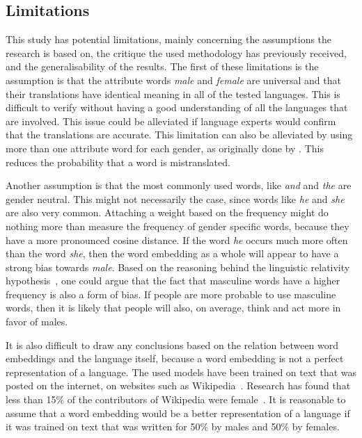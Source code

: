 \subsection{Limitations}
This study has potential limitations, mainly concerning the assumptions the research is based on, the critique the used methodology has previously received, and the generalisability of the results.  
The first of these limitations is the assumption is that
the attribute words \emph{male} and \emph{female} are universal and that their translations
have identical meaning in all of the tested languages. This is difficult
to verify without having a good understanding of all the languages that are involved.
This issue could be alleviated if language experts would confirm that the
translations are accurate.
This limitation can also be alleviated by using more than one
attribute word for each gender, as originally done by \textcite{caliskan_2017_semantics_language_corpora}. This reduces the probability that a word is mistranslated. 

Another assumption is that the most commonly used words, like \textit{and} and \textit{the}
are gender neutral. This might not necessarily the case, since words like \textit{he} and
\textit{she} are also very common. Attaching a weight based on the frequency might do
nothing more than measure the frequency of gender specific words, because they have a
more pronounced cosine distance. If the word \textit{he} occurs much more often than
the word \textit{she}, then the word embedding as a whole will appear to have a strong
bias towards \textit{male}. Based on the reasoning behind the
linguistic relativity hypothesis~\parencite{lucy_linguistic_1997}, one could argue that the fact
that masculine words
have a higher frequency is also a form of bias. If people are more probable
to use masculine words, then it is likely that people will also, on average, think and
act more in favor of males.

It is also difficult to draw any conclusions based on the relation between word
embeddings and the language itself, because a word embedding is not a perfect
representation of a language. The used models have been trained on text that was 
posted on the internet, on websites such as Wikipedia~\parencite{grave2018learning}.
Research has found that less than 15\% of the
contributors of Wikipedia were female~\parencite{collier_wikipedia_gender_gap_2012}.  It is reasonable to assume that a word embedding
would be a better representation of a language if it was trained on text that was written
for 50\% by males and 50\% by females.

